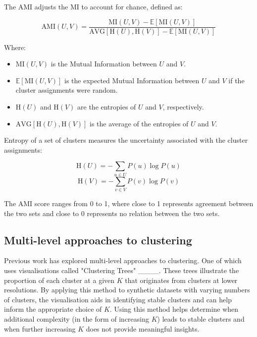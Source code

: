 The AMI adjusts the MI to account for chance, defined as:

\begin{equation}
\label{eq:AMI}
\text{AMI}(U, V) = \frac{\text{MI}(U, V) - \mathbb{E}[\text{MI}(U, V)]}{\text{AVG}[\text{H}(U), \text{H}(V)] - \mathbb{E}[\text{MI}(U, V)]}
\end{equation}

Where:
\begin{itemize}
    \item \( \text{MI}(U, V) \) is the Mutual Information between \( U \) and \( V \).
    \item \( \mathbb{E}[\text{MI}(U, V)] \) is the expected Mutual Information between \( U \) and \( V \) if the cluster assignments were random.
    \item \( \text{H}(U) \) and \( \text{H}(V) \) are the entropies of \( U \) and \( V \), respectively.
    \item \( \text{AVG}[\text{H}(U), \text{H}(V)] \) is the average of the entropies of \( U \) and \( V \).
\end{itemize}

Entropy of a set of clusters measures the uncertainty associated with the cluster assignments:

\[
\text{H}(U) = -\sum_{u \in U} P(u) \log P(u)
\]
\[
\text{H}(V) = -\sum_{v \in V} P(v) \log P(v)
\]



The AMI score ranges from 0 to 1, where close to 1 represents agreement between the two sets and close to 0 represents no relation between the two sets.


\subsection*{Multi-level approaches to clustering}
Previous work has explored multi-level approaches to clustering. One of which uses visualisations called "Clustering Trees" ____. These trees illustrate the proportion of each cluster at a given $K$ that originates from clusters at lower resolutions. By applying this method to synthetic datasets with varying numbers of clusters, the visualisation aids in identifying stable clusters and can help inform the appropriate choice of $K$. Using this method helps determine when additional complexity (in the form of increasing $K$) leads to stable clusters and when further increasing $K$ does not provide meaningful insights.

